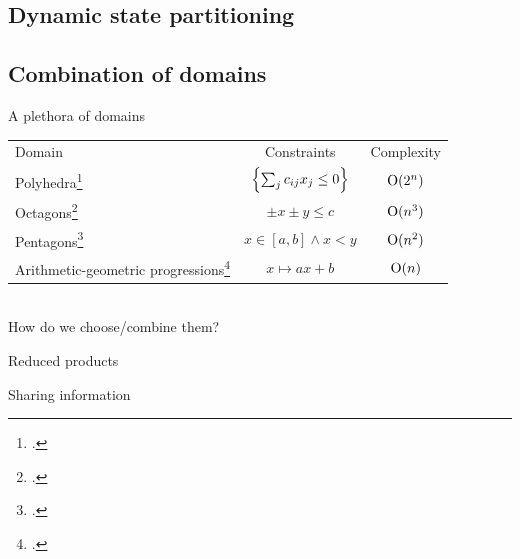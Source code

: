 \documentclass[aspectratio=169]{beamer}
\begin{document}
\subsection{Dynamic state partitioning}
\begin{frame}{}
  
\end{frame}

\begin{frame}{}
  
\end{frame}

\subsection{Combination of domains}
\begin{frame}{A plethora of domains}
  \begin{tabular*}{1.0\linewidth}{lcc}
    Domain & Constraints & Complexity \\
    Polyhedra\footcite{cousot1978automatic} & \( \left\{\sum_{j} c_{ij}x_j \leq 0\right\} \) & $ \operatorname{O}(2^n) $ \\
    Octagons\footcite{mine2004weakly} & \( \pm x \pm y \leq c \) & $ \operatorname{O}(n^3) $ \\
    Pentagons\footcite{logozzo2010pentagons} & \( x \in [a,b] \wedge x < y \) & $ \operatorname{O}(n^2) $ \\
    Arithmetic-geometric progressions\footcite{feret2005arithmetic} & \( x \mapsto ax + b \) & $ \operatorname{O}(n) $
  \end{tabular*}

   \\
  \alert<2->{How do we choose/combine them?}
\end{frame}

\begin{frame}{Reduced products}
\end{frame}

\begin{frame}{Sharing information}
\end{frame}
\end{document}

